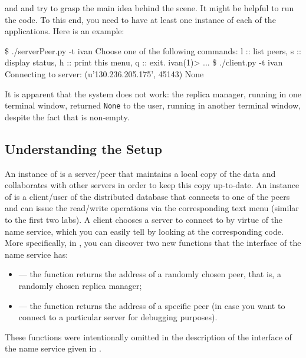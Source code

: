 \documentclass[a4paper]{article}
\begin{document}
 and  and try to grasp the main idea
behind the scene. It might be helpful to run the code. To this end, you need to
have at least one instance of each of the applications. Here is an example:
\begin{shell}
\$ ./serverPeer.py -t ivan
Choose one of the following commands:
    l  ::  list peers,
    s  ::  display status,
    h  ::  print this menu,
    q  ::  exit.
ivan(1)>
...
\$ ./client.py -t ivan
Connecting to server: (u'130.236.205.175', 45143)
None
\end{shell}
It is apparent that the system does not work: the replica manager, running in
one terminal window, returned \texttt{None} to the user, running in another
terminal window, despite the fact that  is non-empty.

\subsection{Understanding the Setup}
An instance of  is a server/peer that maintains a local
copy of the data and collaborates with other servers in order to keep this copy
up-to-date. An instance of  is a client/user of the
distributed database that connects to one of the peers and can issue the
read/write operations via the corresponding text menu (similar to the first two
labs). A client chooses a server to connect to by virtue of the name service,
which you can easily tell by looking at the corresponding code. More
specifically, in , you can discover two new functions that
the interface of the name service has:
\begin{itemize}

  \item {} --- the function returns the address of a randomly
  chosen peer, that is, a randomly chosen replica manager;

  \item {} --- the function returns the address of a
  specific peer (in case you want to connect to a particular server for
  debugging purposes).

\end{itemize}
These functions were intentionally omitted in the description of the interface
of the name service given in .
\end{document}
